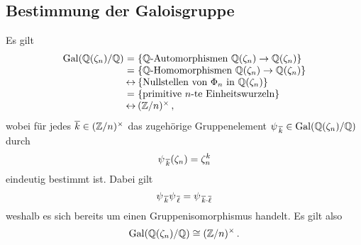 \subsection{Bestimmung der Galoisgruppe}

Es gilt
  \[
  \arraycolsep=1pt
  \begin{array}{rcl}
      \Gal{\Rational(\zeta_n)/\Rational}
    & =
    & \{ \text{$\Rational$-Automorphismen $\Rational(\zeta_n) \to \Rational(\zeta_n)$} \}
    \\
      {}
    & =
    & \{ \text{$\Rational$-Homomorphismen $\Rational(\zeta_n) \to \Rational(\zeta_n)$} \}
    \\
      {}
    & \leftrightarrow
    & \{ \text{Nullstellen von $\Phi_n$ in $\Rational(\zeta_n)$} \}
    \\
      {}
    & =
    & \{\text{primitive $n$-te Einheitswurzeln}\}
    \\
      {}
    & \leftrightarrow
    & \unitgroup{(\Integer/n)} \,,
    \\
  \end{array}
\]
wobei für jedes $\overline{k} \in (\mathbb{Z}/n)^{\times}$ das zugehörige Gruppenelement $\psi_{\,\overline{k}} \in \operatorname{Gal}(\mathbb{Q}(\zeta_n)/\mathbb{Q})$ durch
\[
    \psi_{\,\overline{k}}(\zeta_n)
  = \zeta_n^k
\]
eindeutig bestimmt ist.
Dabei gilt
\[
    \psi_{\,\overline{k}} \psi_{\,\overline{\ell}}
  = \psi_{\,\overline{k} \cdot \overline{\ell}}
\]
weshalb es sich bereits um einen Gruppenisomorphismus handelt.
Es gilt also
\[
        \operatorname{Gal}(\mathbb{Q}(\zeta_n)/\mathbb{Q})
  \cong (\mathbb{Z}/n)^{\times} \,.
\]









